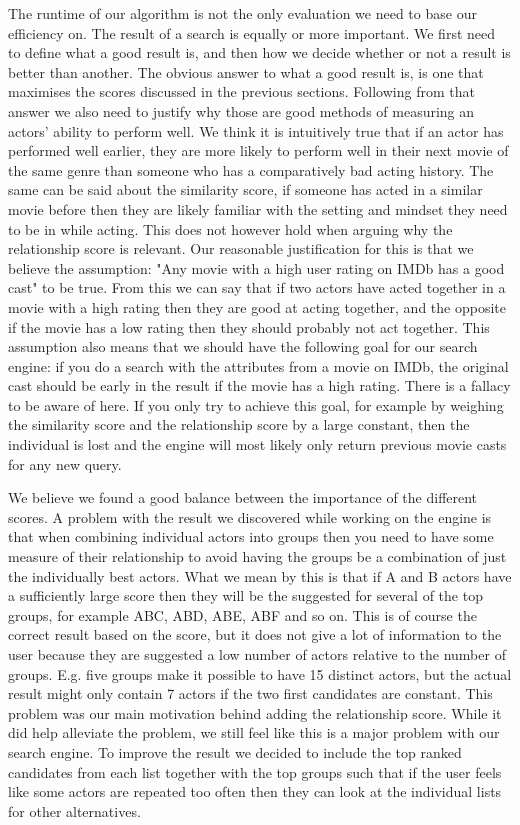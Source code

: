 The runtime of our algorithm is not the only evaluation we need to base our efficiency on. The result of a search is equally or more important. We first need to define what a good result is, and then how we decide whether or not a result is better than another. The obvious answer to what a good result is, is one that maximises the scores discussed in the previous sections. Following from that answer we also need to justify why those are good methods of measuring an actors’ ability to perform well. We think it is intuitively true that if an actor has performed well earlier, they are more likely to perform well in their next movie of the same genre than someone who has a comparatively bad acting history. The same can be said about the similarity score, if someone has acted in a similar movie before then they are likely familiar with the setting and mindset they need to be in while acting. This does not however hold when arguing why the relationship score is relevant. Our reasonable justification for this is that we believe the assumption: "Any movie with a high user rating on IMDb has a good cast" to be true. From this we can say that if two actors have acted together in a movie with a high rating then they are good at acting together, and the opposite if the movie has a low rating then they should probably not act together. This assumption also means that we should have the following goal for our search engine: if you do a search with the attributes from a movie on IMDb, the original cast should be early in the result if the movie has a high rating. There is a fallacy to be aware of here. If you only try to achieve this goal, for example by weighing the similarity score and the relationship score by a large constant, then the individual is lost and the engine will most likely only return previous movie casts for any new query. 

We believe we found a good balance between the importance of the different scores. A problem with the result we discovered while working on the engine is that when combining individual actors into groups then you need to have some measure of their relationship to avoid having the groups be a combination of just the individually best actors. What we mean by this is that if A and B actors have a sufficiently large score then they will be the suggested for several of the top groups, for example ABC, ABD, ABE, ABF and so on. This is of course the correct result based on the score, but it does not give a lot of information to the user because they are suggested a low number of actors relative to the number of groups. E.g. five groups make it possible to have 15 distinct actors, but the actual result might only contain 7 actors if the two first candidates are constant. This problem was our main motivation behind adding the relationship score. While it did help alleviate the problem, we still feel like this is a major problem with our search engine. To improve the result we decided to include the top ranked candidates from each list together with the top groups such that if the user feels like some actors are repeated too often then they can look at the individual lists for other alternatives.
